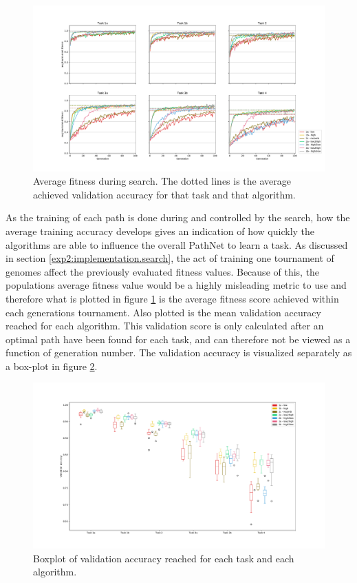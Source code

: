 \begin{figure}
    \includegraphics[width=1.2\textwidth,center]{Chapters/4.Experiments/exp2/figures/large/Training_accuracy.pdf}
    \caption[Fitness plot]{Average fitness during search. The dotted lines is the average achieved validation accuracy for that task and that algorithm.}
    \label{fig:search.accuracy}
\end{figure}

As the training of each path is done during and controlled by the search, how the average training accuracy develops gives an indication of how quickly the algorithms are able to influence the overall PathNet to learn a task. As discussed in section \ref{exp2:implementation.search}, the act of training one tournament of genomes affect the previously evaluated fitness values. Because of this, the populations average fitness value would be a highly misleading metric to use and therefore what is plotted in figure \ref{fig:search.accuracy} is the average fitness score achieved within each generations tournament. Also plotted is the mean validation accuracy reached for each algorithm. This validation score is only calculated after an optimal path have been found for each task, and can therefore not be viewed as a function of generation number. The validation accuracy is visualized separately as a box-plot in figure \ref{fig:search.validation}.

\begin{figure}
    \includegraphics[width=1.2\textwidth, center]{Chapters/4.Experiments/exp2/figures/large/validation_boxplot.pdf}
    \caption[Validation accuracy plot]{Boxplot of validation accuracy reached for each task and each algorithm.}
    \label{fig:search.validation}
\end{figure}

